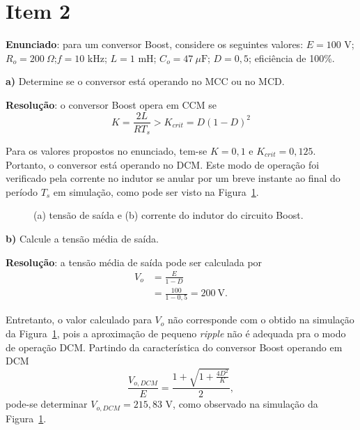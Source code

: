 \section*{Item 2}\label{it:2}

\textbf{Enunciado}: para um conversor Boost, considere os seguintes valores: $E = 100$ V; $R_o = 200~\Omega$;$f = 10$ kHz; $L = 1$ mH; $C_o = 47~\mu\mathrm{F}$; $D = 0{,}5$; eficiência de 100\%.

\medskip
\textbf{a)} Determine se o conversor está operando no MCC ou no MCD.

\medskip
\textbf{Resolução}: o conversor Boost opera em CCM se~\cite{Eri:20}
\begin{equation}
	K = \frac{2L}{RT_s} > K_{crit} = D(1 - D)^2
\end{equation}

Para os valores propostos no enunciado, tem-se $K = 0{,}1$ e $K_{crit} = 0{,}125$. Portanto, o conversor está operando no DCM. Este modo de operação foi verificado pela corrente no indutor se anular por um breve instante ao final do período $T_s$ em simulação, como pode ser visto na Figura~\ref{fig:ex2_1}.
\begin{figure}[htb!]
	\centering
	
	\caption{(a) tensão de saída e (b) corrente do indutor do circuito Boost.}
	\label{fig:ex2_1}
\end{figure}

\medskip
\textbf{b)} Calcule a tensão média de saída.

\medskip
\textbf{Resolução}: a tensão média de saída pode ser calculada por~\cite{Eri:20}
\begin{equation*}
	\begin{aligned}
		V_o &= \frac{E}{1-D} \\
		&= \frac{100}{1-0{,}5} = 200~\mathrm{V}.
	\end{aligned}
\end{equation*}

Entretanto, o valor calculado para $V_o$ não corresponde com o obtido na simulação da Figura~\ref{fig:ex2_1}, pois a aproximação de pequeno \textit{ripple} não é adequada pra o modo de operação DCM. Partindo da característica do conversor Boost operando em DCM~\cite{Eri:20}
\begin{equation*}
	\frac{V_{o,DCM}}{E} = \frac{1 + \sqrt{1 + \frac{4D^2}{K}}}{2},
\end{equation*}
pode-se determinar $V_{o,DCM} = 215{,}83$ V, como observado na simulação da Figura~\ref{fig:ex2_1}.

